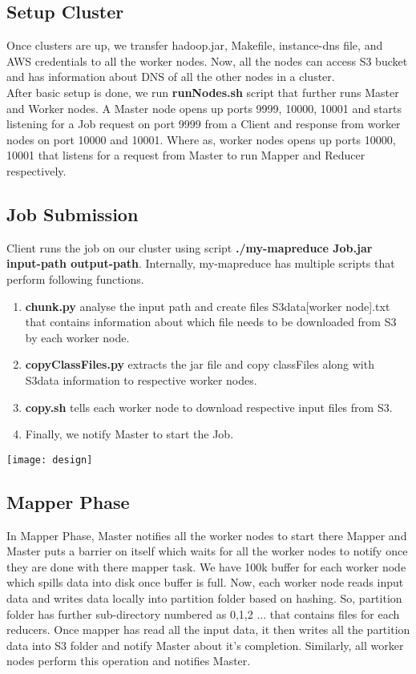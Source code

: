 \documentclass{article}
\begin{document}
\subsection{Setup Cluster}
Once clusters are up, we transfer hadoop.jar, Makefile, instance-dns file, and AWS credentials to all the worker nodes. Now, all the nodes can access S3 bucket and has information about DNS of all the other nodes in a cluster.\\
After basic setup is done, we run \textbf{runNodes.sh} script that further runs Master and Worker nodes. A Master node opens up ports {9999, 10000, 10001} and starts listening for a Job request on port 9999 from a Client and response from worker nodes on port 10000 and 10001. Where as, worker nodes opens up ports {10000, 10001} that listens for a request from Master to run Mapper and Reducer respectively.\\

\subsection{Job Submission}
Client runs the job on our cluster using script \textbf{./my-mapreduce Job.jar input-path output-path}. Internally, my-mapreduce has multiple scripts that perform following functions.
\begin{enumerate}
    \item \textbf{chunk.py} analyse the input path and create files S3data[worker node].txt that contains information about which file needs to be downloaded from S3 by each worker node.
    \item \textbf{copyClassFiles.py} extracts the jar file and copy classFiles along with S3data information to respective worker nodes.
    \item \textbf{copy.sh} tells each worker node to download respective input files from S3.
    \item Finally, we notify Master to start the Job.
\end{enumerate}

\texttt{[image: design]}
\pagebreak

\subsection{Mapper Phase}
In Mapper Phase, Master notifies all the worker nodes to start there Mapper and Master puts a barrier on itself which waits for all the worker nodes to notify once they are done with there mapper task. We have 100k buffer for each worker node which spills data into disk once buffer is full. Now, each worker node reads input data and writes data locally into partition folder based on hashing. So, partition folder has further sub-directory numbered as {0,1,2 ...} that contains files for each reducers. Once mapper has read all the input data, it then writes all the partition data into S3 folder and notify Master about it's completion. Similarly, all worker nodes perform this operation and notifies Master.
\end{document}
